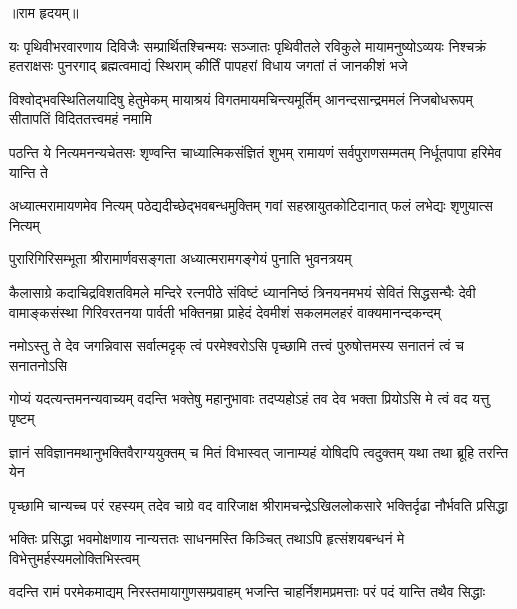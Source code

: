 



॥राम हृदयम्॥

\fourlineindentedshloka
{यः पृथिवीभरवारणाय दिविजैः सम्प्रार्थितश्चिन्मयः}
{सञ्जातः पृथिवीतले रविकुले मायामनुष्योऽव्ययः}
{निश्चक्रं हतराक्षसः पुनरगाद् ब्रह्मत्वमाद्यं स्थिराम्}
{कीर्तिं पापहरां विधाय जगतां तं जानकीशं भजे} %

\fourlineindentedshloka
{विश्वोद्भवस्थितिलयादिषु हेतुमेकम्}
{मायाश्रयं विगतमायमचिन्त्यमूर्तिम्}
{आनन्दसान्द्रममलं निजबोधरूपम्}
{सीतापतिं विदिततत्त्वमहं नमामि} %

\fourlineindentedshloka
{पठन्ति ये नित्यमनन्यचेतसः}
{शृण्वन्ति चाध्यात्मिकसंज्ञितं शुभम्}
{रामायणं सर्वपुराणसम्मतम्}
{निर्धूतपापा हरिमेव यान्ति ते} %

\fourlineindentedshloka
{अध्यात्मरामायणमेव नित्यम्}
{पठेद्यदीच्छेद्भवबन्धमुक्तिम्}
{गवां सहस्रायुतकोटिदानात्}
{फलं लभेद्यः शृणुयात्स नित्यम्} %

\twolineshloka
{पुरारिगिरिसम्भूता श्रीरामार्णवसङ्गता}
{अध्यात्मरामगङ्गेयं पुनाति भुवनत्रयम्} %

\fourlineindentedshloka
{कैलासाग्रे कदाचिद्रविशतविमले मन्दिरे रत्नपीठे}
{संविष्टं ध्याननिष्ठं त्रिनयनमभयं सेवितं सिद्धसन्घैः}
{देवी वामाङ्कसंस्था गिरिवरतनया पार्वती भक्तिनम्रा}
{प्राहेदं देवमीशं सकलमलहरं वाक्यमानन्दकन्दम्} %


\fourlineindentedshloka
{नमोऽस्तु ते देव जगन्निवास}
{सर्वात्मदृक् त्वं परमेश्वरोऽसि}
{पृच्छामि तत्त्वं पुरुषोत्तमस्य}
{सनातनं त्वं च सनातनोऽसि} %

\fourlineindentedshloka
{गोप्यं यदत्यन्तमनन्यवाच्यम्}
{वदन्ति भक्तेषु महानुभावाः}
{तदप्यहोऽहं तव देव भक्ता}
{प्रियोऽसि मे त्वं वद यत्तु पृष्टम्} %

\fourlineindentedshloka
{ज्ञानं सविज्ञानमथानुभक्तिवैराग्ययुक्तम्}
{च मितं विभास्वत्}
{जानाम्यहं योषिदपि त्वदुक्तम्}
{यथा तथा ब्रूहि तरन्ति येन} %

\fourlineindentedshloka
{पृच्छामि चान्यच्च परं रहस्यम्}
{तदेव चाग्रे वद वारिजाक्ष}
{श्रीरामचन्द्रेऽखिललोकसारे}
{भक्तिर्दृढा नौर्भवति प्रसिद्धा} %

\fourlineindentedshloka
{भक्तिः प्रसिद्धा भवमोक्षणाय}
{नान्यत्ततः साधनमस्ति किञ्चित्}
{तथाऽपि हृत्संशयबन्धनं मे}
{विभेत्तुमर्हस्यमलोक्तिभिस्त्वम्} %

\fourlineindentedshloka
{वदन्ति रामं परमेकमाद्यम्}
{निरस्तमायागुणसम्प्रवाहम्}
{भजन्ति चाहर्निशमप्रमत्ताः}
{परं पदं यान्ति तथैव सिद्धाः} %

